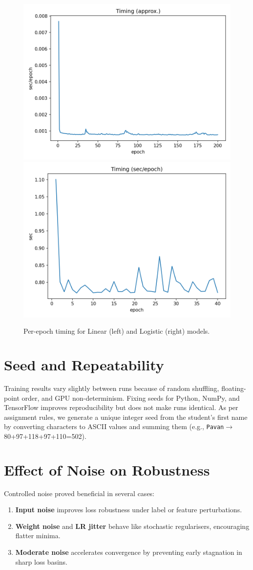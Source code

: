 \documentclass{article}
\begin{document}
\begin{figure}[t]
\centering
\includegraphics[width=.48\linewidth]{figs/linreg_l2_lr0.05_noise0.5_seed808_time.png}\hfill
\includegraphics[width=.48\linewidth]{figs/fashionmnist_adam_b256_lr0.001_val0.1_seed808_time.png}
\caption{Per-epoch timing for Linear (left) and Logistic (right) models.}
\label{fig:lin-time}\label{fig:log-time}
\end{figure}

\section{Seed and Repeatability}
Training results vary slightly between runs because of random shuffling, floating-point order, and GPU non-determinism. Fixing seeds for Python, NumPy, and TensorFlow improves reproducibility but does not make runs identical. As per assignment rules, we generate a unique integer seed from the student’s first name by converting characters to ASCII values and summing them (e.g., \texttt{Pavan}$\to$80+97+118+97+110=502).

\section{Effect of Noise on Robustness}
Controlled noise proved beneficial in several cases:
\begin{enumerate}
    \item \textbf{Input noise} improves loss robustness under label or feature perturbations.
    \item \textbf{Weight noise} and \textbf{LR jitter} behave like stochastic regularisers, encouraging flatter minima.
    \item \textbf{Moderate noise} accelerates convergence by preventing early stagnation in sharp loss basins.
\end{enumerate}
\end{document}
